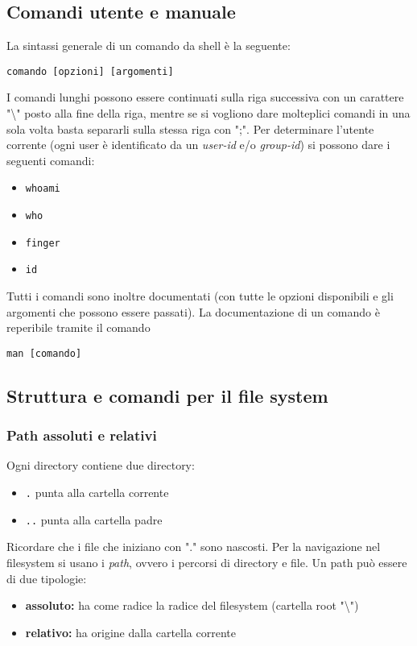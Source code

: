 \documentclass[a4paper, 10pt]{article}
\begin{document}
\subsection{Comandi utente e manuale}
La sintassi generale di un comando da shell è la seguente:
\begin{verbatim}
comando [opzioni] [argomenti]
\end{verbatim}
I comandi lunghi possono essere continuati sulla riga successiva con un carattere "\textbackslash" posto alla fine della riga, mentre se si vogliono dare molteplici comandi in una sola volta basta separarli sulla stessa riga con ";".
Per determinare l'utente corrente (ogni user è identificato da un \textit{user-id} e/o \textit{group-id}) si possono dare i seguenti comandi:
\begin{itemize}
\item \verb|whoami|
\item \verb|who|
\item \verb|finger|
\item \verb|id|
\end{itemize}
Tutti i comandi sono inoltre documentati (con tutte le opzioni disponibili e gli argomenti che possono essere passati). La documentazione di un comando è reperibile tramite il comando
\begin{verbatim}
man [comando]
\end{verbatim}
\subsection{Struttura e comandi per il file system}
\subsubsection{Path assoluti e relativi}
Ogni directory contiene due directory:
\begin{itemize}
\item \verb|.| punta alla cartella corrente
\item \verb|..| punta alla cartella padre
\end{itemize}
Ricordare che i file che iniziano con "." sono nascosti.
Per la navigazione nel filesystem si usano i \textit{path}, ovvero i percorsi di directory e file. Un path può essere di due tipologie:
\begin{itemize}
\item \textbf{assoluto:} ha come radice la radice del filesystem (cartella root "\textbackslash")
\item \textbf{relativo:} ha origine dalla cartella corrente
\end{itemize}
\end{document}
